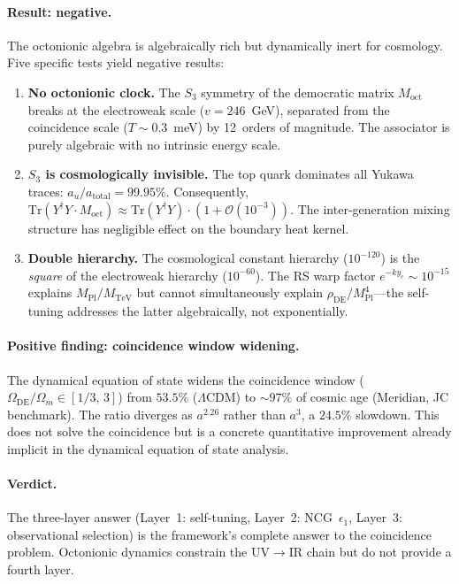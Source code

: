 \paragraph{Result: negative.} The octonionic algebra is algebraically rich but dynamically inert for cosmology. Five specific tests yield negative results:

\begin{enumerate}
  \item \textbf{No octonionic clock.} The $S_3$ symmetry of the democratic matrix $M_{\mathrm{oct}}$ breaks at the electroweak scale ($v = 246$~GeV), separated from the coincidence scale ($T \sim 0.3$~meV) by 12~orders of magnitude. The associator is purely algebraic with no intrinsic energy scale.
  \item \textbf{$S_3$ is cosmologically invisible.} The top quark dominates all Yukawa traces: $a_u/a_{\mathrm{total}} = 99.95\%$. Consequently, $\mathrm{Tr}(Y^\dagger Y \cdot M_{\mathrm{oct}}) \approx \mathrm{Tr}(Y^\dagger Y)\cdot(1 + \mathcal{O}(10^{-3}))$. The inter-generation mixing structure has negligible effect on the boundary heat kernel.
  \item \textbf{Double hierarchy.} The cosmological constant hierarchy ($10^{-120}$) is the \emph{square} of the electroweak hierarchy ($10^{-60}$). The RS warp factor $e^{-k y_c} \sim 10^{-15}$ explains $M_{\mathrm{Pl}}/M_{\mathrm{TeV}}$ but cannot simultaneously explain $\rho_{\mathrm{DE}}/M_{\mathrm{Pl}}^4$---the self-tuning addresses the latter algebraically, not exponentially.
\end{enumerate}

\paragraph{Positive finding: coincidence window widening.} The dynamical equation of state widens the coincidence window ($\Omega_{\mathrm{DE}}/\Omega_m \in [1/3,\, 3]$) from $53.5\%$ ($\Lambda$CDM) to ${\sim}\!97\%$ of cosmic age (Meridian, JC benchmark). The ratio diverges as $a^{2.26}$ rather than $a^3$, a $24.5\%$ slowdown. This does not solve the coincidence but is a concrete quantitative improvement already implicit in the dynamical equation of state analysis.

\paragraph{Verdict.} The three-layer answer (Layer~1: self-tuning, Layer~2: NCG~$\epsilon_1$, Layer~3: observational selection) is the framework's complete answer to the coincidence problem. Octonionic dynamics constrain the UV$\to$IR chain but do not provide a fourth layer.

